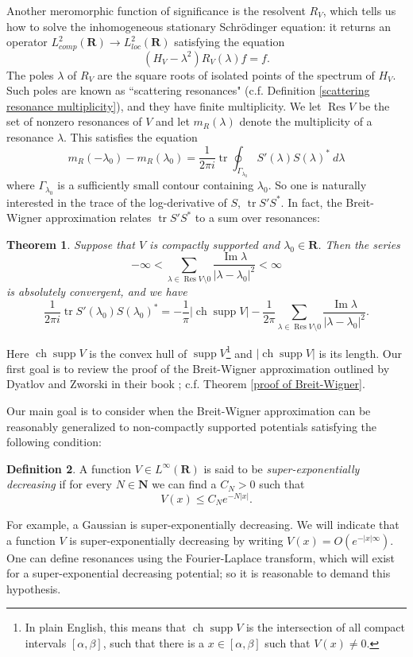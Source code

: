 \documentclass[12pt]{report}
\newcommand{\NN}{\mathbf{N}}
\newcommand{\RR}{\mathbf{R}}
\DeclareMathOperator{\ch}{ch}
\DeclareMathOperator{\Res}{Res}
\DeclareMathOperator{\supp}{supp}
\newcommand{\tr}{\operatorname{tr}}
\newcommand{\dfn}[1]{\emph{#1}\index{#1}}
\renewcommand{\Im}{\operatorname{Im}}
\newtheorem{theorem}{Theorem}[chapter]
\theoremstyle{definition}
\newtheorem{definition}[theorem]{Definition}
\begin{document}
Another meromorphic function of significance is the resolvent $R_V$, which tells us how to solve the inhomogeneous stationary Schrödinger equation: it returns an operator $L^2_{comp}(\RR) \to L^2_{loc}(\RR)$ satisfying the equation
$$(H_V - \lambda^2)R_V(\lambda)f = f.$$
The poles $\lambda$ of $R_V$ are the square roots of isolated points of the spectrum of $H_V$. Such poles are known as ``scattering resonances" (c.f. Definition \ref{scattering resonance multiplicity}), and they have finite multiplicity.
We let $\Res V$ be the set of nonzero resonances of $V$ and let $m_R(\lambda)$ denote the multiplicity of a resonance $\lambda$. This satisfies the equation
$$m_R(-\lambda_0) - m_R(\lambda_0) = \frac{1}{2\pi i}\tr \oint_{\Gamma_{\lambda_0}} S'(\lambda)S(\lambda)^* ~d\lambda$$
where $\Gamma_{\lambda_0}$ is a sufficiently small contour containing $\lambda_0$.
So one is naturally interested in the trace of the log-derivative of $S$, $\tr S'S^*$.
In fact, the Breit-Wigner approximation relates $\tr S'S^*$ to a sum over resonances:
\begin{theorem}
Suppose that $V$ is compactly supported and $\lambda_0 \in \RR$. Then the series
\begin{equation}
\label{Breit-Wigner series}
-\infty < \sum_{\lambda \in \Res V \setminus 0} \frac{\Im \lambda}{|\lambda - \lambda_0|^2} < \infty
\end{equation}
is absolutely convergent, and we have
\begin{equation}
\label{Breit-Wigner formula}
\frac{1}{2\pi i} \tr S'(\lambda_0) S(\lambda_0)^* = -\frac{1}{\pi}|\ch\supp V| - \frac{1}{2\pi}\sum_{\lambda \in \Res V \setminus 0}\frac{\Im \lambda}{|\lambda - \lambda_0|^2}.
\end{equation}
\end{theorem}
Here $\ch\supp V$ is the convex hull of $\supp V$\footnote{In plain English, this means that $\ch \supp V$ is the intersection of all compact intervals $[\alpha, \beta]$, such that there is a $x \in [\alpha, \beta]$ such that $V(x) \neq 0$.} and $|\ch\supp V|$ is its length.
Our first goal is to review the proof of the Breit-Wigner approximation outlined by Dyatlov and Zworski in their book \cite{dyatlov2019mathematical}; c.f. Theorem \ref{proof of Breit-Wigner}.

Our main goal is to consider when the Breit-Wigner approximation can be reasonably generalized to non-compactly supported potentials satisfying the following condition:
\begin{definition}
A function $V \in L^\infty(\RR)$ is said to be \dfn{super-exponentially decreasing} if for every $N \in \NN$ we can find a $C_N > 0$ such that
$$V(x) \leq C_Ne^{-N|x|}.$$
\end{definition}
For example, a Gaussian is super-exponentially decreasing. We will indicate that a function $V$ is super-exponentially decreasing by writing $V(x) = O(e^{-|x|\infty})$.
One can define resonances using the Fourier-Laplace transform, which will exist for a super-exponential decreasing potential; so it is reasonable to demand this hypothesis.
\end{document}
